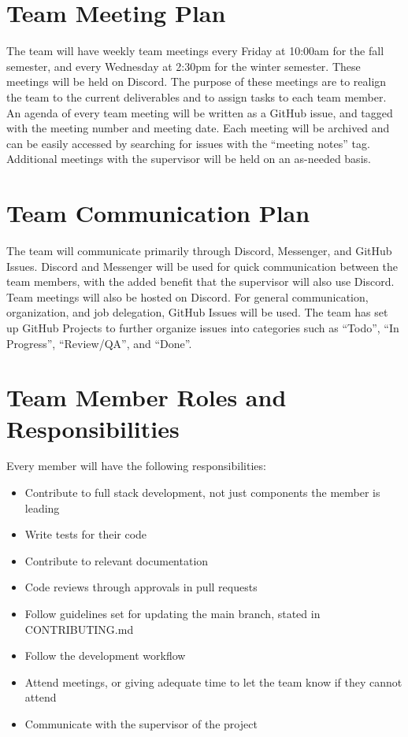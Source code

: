 \documentclass{article}
\begin{document}
\section{Team Meeting Plan}

The team will have weekly team meetings every Friday at 10:00am for the fall semester, and every
Wednesday at 2:30pm for the winter semester. These meetings will be held on Discord. The purpose of
these meetings are to realign the team to the current deliverables and to assign tasks to each team
member. An agenda of every team meeting will be written as a GitHub issue, and tagged with the
meeting number and meeting date. Each meeting will be archived and can be easily accessed by
searching for issues with the ``meeting notes'' tag. Additional meetings with the supervisor will
be held on an as-needed basis.

\section{Team Communication Plan}

The team will communicate primarily through Discord, Messenger, and GitHub Issues. Discord and
Messenger will be used for quick communication between the team members, with the added benefit
that the supervisor will also use Discord. Team meetings will also be hosted on Discord. For
general communication, organization, and job delegation, GitHub Issues will be used. The team has
set up GitHub Projects to further organize issues into categories such as ``Todo'', ``In
Progress'', ``Review/QA'', and ``Done''.

\section{Team Member Roles and Responsibilities}

Every member will have the following responsibilities:

\begin{itemize}
	\item Contribute to full stack development, not just components the member is leading
	\item Write tests for their code
	\item Contribute to relevant documentation
	\item Code reviews through approvals in pull requests
	\item Follow guidelines set for updating the main branch, stated in CONTRIBUTING.md
	\item Follow the development workflow
	\item Attend meetings, or giving adequate time to let the team know if they cannot attend
	\item Communicate with the supervisor of the project
\end{itemize}
\end{document}
